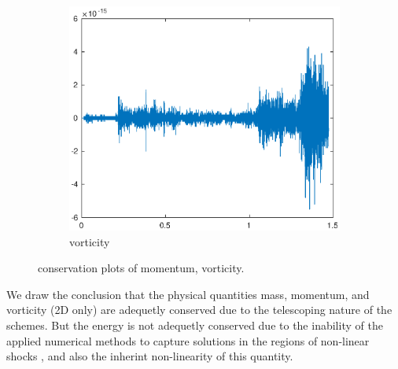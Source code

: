 \begin{figure}[h!]
\begin{subfigure}[b]{0.9\textwidth}
        \centering
        \includegraphics[width=1.1\textwidth,height=0.52\textwidth]{images/cons_vort.eps}\hfill
        \caption{vorticity}
        \label{Momentum}
    \end{subfigure}
    \caption{conservation plots of momentum, vorticity.}
    \label{fig:2Dcons_B}
\end{figure}

We draw the conclusion that the physical quantities mass, momentum, and vorticity (2D only) are adequetly conserved due to the telescoping nature of the schemes.
But the energy is not adequetly conserved due to the inability of the applied numerical methods to capture solutions in the regions of non-linear shocks \cite{Lax}, and also the 
inherint non-linearity of this quantity. 
